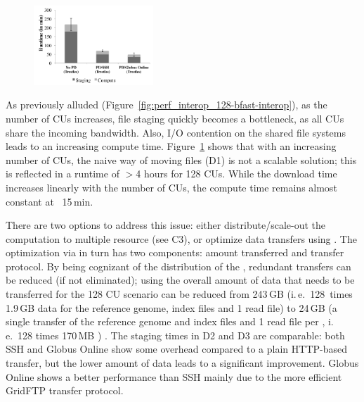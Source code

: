 \documentclass[conference]{IEEEtran}
\begin{document}
\begin{figure}[t]
	\upp
	\centering
		\includegraphics[width=0.4\textwidth]{../perf/sc/pd-128cus.pdf}
	\caption{}
	\label{fig:perf_sc_download-concurrent-cus}
\end{figure}


As previously alluded
(Figure~\ref{fig:perf_interop_128-bfast-interop}), as the number of
CUs increases, file staging quickly becomes a bottleneck, as all CUs
share the incoming bandwidth.  Also, I/O contention on the shared file
systems leads to an increasing compute time.
Figure~\ref{fig:perf_sc_download-concurrent-cus} shows that with an
increasing number of CUs, the naive way of moving files (D1) is not a
scalable solution; this is reflected in a runtime of $>$4 hours for 128
CUs.  While the download time increases linearly with the number of
CUs, the compute time remains almost constant at ~15\,min.

There are two options to address this issue: either
distribute/scale-out the computation to multiple resource (see C3), or
optimize data transfers using \pilotdata.  The optimization via
\pilotdata in turn has two components: amount transferred and transfer
protocol.  By being cognizant of the distribution of the \cus,
redundant transfers can be reduced (if not eliminated); using
\pilotdata the overall amount of data that needs to be transferred for
the 128 CU scenario can be reduced from 243\,GB (i.\,e.\ 128\,\cus
times 1.9\,GB data for the reference genome, index files and 1 read
file) to 24\,GB (a single transfer of the reference genome and index
files and 1 read file per \cu, i.\,e.\ 128 times 170\,MB ) .  The
staging times in D2 and D3 are comparable: both SSH and Globus Online
show some overhead compared to a plain HTTP-based transfer, but the
lower amount of data leads to a significant improvement.  Globus
Online shows a better performance than SSH mainly due to the more
efficient GridFTP transfer protocol.
\end{document}
